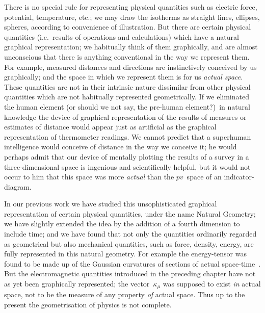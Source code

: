 \documentclass[12pt]{book}
\begin{document}
There is no special rule for representing physical quantities such as electric
force, potential, temperature, etc.; we may draw the isotherms as straight
lines, ellipses, spheres, according to convenience of illustration. But there are
certain physical quantities (i.e.\ results of operations and calculations) which
have a natural graphical representation; we habitually think of them graphically,
and are almost unconscious that there is anything conventional in the
way we represent them. For example, measured distances and directions are
instinctively conceived by us graphically; and the space in which we represent
them is for us \emph{actual space}. These quantities are not in their intrinsic
nature dissimilar from other physical quantities which are not habitually represented
geometrically. If we eliminated the human element (or should we not
say, the pre-human element?)\ in natural knowledge the device of graphical
representation of the results of measures or estimates of distance would appear
just as artificial as the graphical representation of thermometer readings. We
cannot predict that a superhuman intelligence would conceive of distance in
the way we conceive it; he would perhaps admit that our device of mentally
plotting the results of a survey in a three-dimensional space is ingenious and
scientifically helpful, but it would not occur to him that this space was more
\emph{actual} than the $pv$~space of an indicator-diagram.

In our previous work we have studied this unsophisticated graphical representation
of certain physical quantities, under the name Natural Geometry;
we have slightly extended the idea by the addition of a fourth dimension to
include time; and we have found that not only the quantities ordinarily
regarded as geometrical but also mechanical quantities, such as force, density,
energy, are fully represented in this natural geometry. For example the energy-tensor
was found to be made up of the Gaussian curvatures of sections of actual
space-time~. But the electromagnetic quantities introduced in the preceding
chapter have not as yet been graphically represented; the vector~$\kappa_{\mu}$ was
supposed to exist \emph{in} actual space, not to be the measure of any property \emph{of} actual
space. Thus up to the present the geometrisation of physics is not complete.
\end{document}
